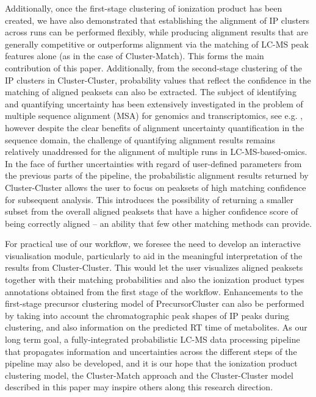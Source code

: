 Additionally, once the first-stage clustering of ionization product has been created, we have also demonstrated that establishing the alignment of IP clusters across runs can be performed flexibly, while producing alignment results that are generally competitive or outperforms alignment via the matching of LC-MS peak features alone (as in the case of Cluster-Match). This forms the main contribution of this paper.  Additionally, from the second-stage clustering of the IP clusters in Cluster-Cluster, probability values that reflect the confidence in the matching of aligned peaksets can also be extracted. The subject of identifying and quantifying uncertainty has been extensively investigated in the problem of multiple sequence alignment (MSA) for genomics and transcriptomics, see e.g. \cite{Landan2009, Notredame2000, Penn2010}, however despite the clear benefits of alignment uncertainty quantification in the sequence domain, the challenge of quantifying alignment results remains relatively unaddressed for the alignment of multiple runs in LC-MS-based-omics. In the face of further uncertainties with regard of user-defined parameters from the previous parts of the pipeline, the probabilistic alignment results returned by Cluster-Cluster allows the user to focus on peaksets of high matching confidence for subsequent analysis.  This introduces the possibility of returning a smaller subset from the overall aligned peaksets that have a higher confidence score of being correctly aligned -- an ability that few other matching methods can provide.

For practical use of our workflow, we foresee the need to develop an interactive visualisation module, particularly to aid in the meaningful interpretation of the results from Cluster-Cluster. This would let the user visualizes aligned peaksets together with their matching probabilities and also the ionization product types annotations obtained from the first stage of the workflow. Enhancements to the first-stage precursor clustering model of PrecursorCluster can also be performed by taking into account the chromatographic peak shapes of IP peaks during clustering, and also information on the predicted RT time of metabolites. As our long term goal, a fully-integrated probabilistic LC-MS data processing pipeline that propagates information and uncertainties across the different steps of the pipeline may also be developed, and it is our hope that the ionization product clustering model, the Cluster-Match approach and the Cluster-Cluster model described in this paper may inspire others along this research direction.